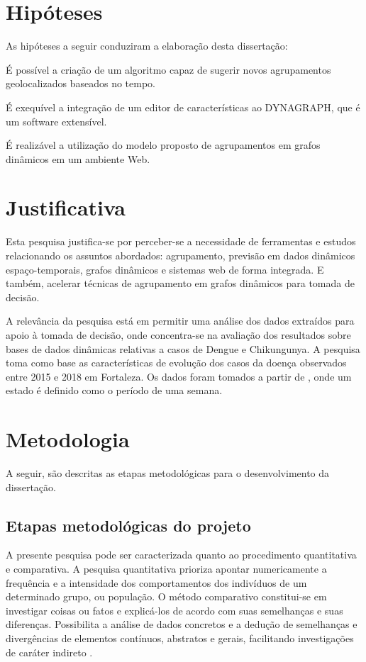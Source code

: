 \section{Hipóteses}
As hipóteses a seguir conduziram a elaboração desta dissertação:
\begin{alineas}
	\item É possível a criação de um algoritmo capaz de sugerir novos agrupamentos geolocalizados baseados no tempo.
	\item É exequível a integração de um editor de características ao DYNAGRAPH, que é um software extensível.
	\item É realizável a utilização do modelo proposto de agrupamentos em grafos dinâmicos em um ambiente Web.
\end{alineas}

\section{Justificativa}
Esta pesquisa justifica-se por perceber-se a necessidade de ferramentas e estudos 
relacionando os assuntos abordados: agrupamento, previsão em dados
dinâmicos espaço-temporais, grafos dinâmicos e sistemas web de forma integrada.
E também, acelerar técnicas de agrupamento em grafos dinâmicos para tomada de decisão.

A relevância da pesquisa está em permitir uma análise dos dados extraídos 
para apoio à tomada de decisão, onde concentra-se na avaliação dos resultados sobre bases de dados
dinâmicas relativas a casos de Dengue e Chikungunya.
A pesquisa toma como base as características de evolução dos casos da doença
observados entre 2015 e 2018 em Fortaleza.
Os dados foram tomados a partir de \cite{simda}, onde um estado é definido como o período de uma semana. 

\section{Metodologia}
A seguir, são descritas as etapas metodológicas para o desenvolvimento da dissertação.

\subsection{Etapas metodológicas do projeto}
A presente pesquisa pode ser caracterizada quanto ao procedimento quantitativa
e comparativa. A pesquisa quantitativa prioriza apontar numericamente a frequência e a
intensidade dos comportamentos dos indivíduos de um determinado grupo, ou população. O
método comparativo constitui-se em investigar coisas ou fatos e explicá-los de acordo com
suas semelhanças e suas diferenças. Possibilita a análise de dados concretos e a dedução de
semelhanças e divergências de elementos contínuos, abstratos e gerais, facilitando investigações
de caráter indireto \cite{fachin}.

